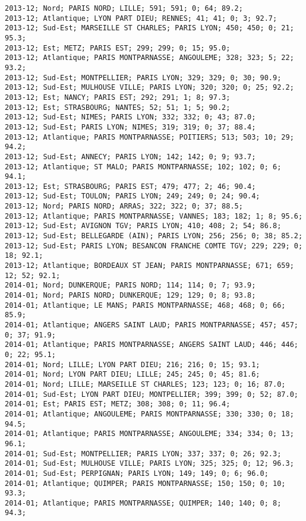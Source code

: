 \documentclass{article}
\begin{document}
\begin{Verbatim}[commandchars=\\\{\}]
2013-12; Nord; PARIS NORD; LILLE; 591; 591; 0; 64; 89.2; 
2013-12; Atlantique; LYON PART DIEU; RENNES; 41; 41; 0; 3; 92.7; 
2013-12; Sud-Est; MARSEILLE ST CHARLES; PARIS LYON; 450; 450; 0; 21; 95.3; 
2013-12; Est; METZ; PARIS EST; 299; 299; 0; 15; 95.0; 
2013-12; Atlantique; PARIS MONTPARNASSE; ANGOULEME; 328; 323; 5; 22; 93.2; 
2013-12; Sud-Est; MONTPELLIER; PARIS LYON; 329; 329; 0; 30; 90.9; 
2013-12; Sud-Est; MULHOUSE VILLE; PARIS LYON; 320; 320; 0; 25; 92.2; 
2013-12; Est; NANCY; PARIS EST; 292; 291; 1; 8; 97.3; 
2013-12; Est; STRASBOURG; NANTES; 52; 51; 1; 5; 90.2; 
2013-12; Sud-Est; NIMES; PARIS LYON; 332; 332; 0; 43; 87.0; 
2013-12; Sud-Est; PARIS LYON; NIMES; 319; 319; 0; 37; 88.4; 
2013-12; Atlantique; PARIS MONTPARNASSE; POITIERS; 513; 503; 10; 29; 94.2; 
2013-12; Sud-Est; ANNECY; PARIS LYON; 142; 142; 0; 9; 93.7; 
2013-12; Atlantique; ST MALO; PARIS MONTPARNASSE; 102; 102; 0; 6; 94.1; 
2013-12; Est; STRASBOURG; PARIS EST; 479; 477; 2; 46; 90.4; 
2013-12; Sud-Est; TOULON; PARIS LYON; 249; 249; 0; 24; 90.4; 
2013-12; Nord; PARIS NORD; ARRAS; 322; 322; 0; 37; 88.5; 
2013-12; Atlantique; PARIS MONTPARNASSE; VANNES; 183; 182; 1; 8; 95.6; 
2013-12; Sud-Est; AVIGNON TGV; PARIS LYON; 410; 408; 2; 54; 86.8; 
2013-12; Sud-Est; BELLEGARDE (AIN); PARIS LYON; 256; 256; 0; 38; 85.2; 
2013-12; Sud-Est; PARIS LYON; BESANCON FRANCHE COMTE TGV; 229; 229; 0; 18; 92.1; 
2013-12; Atlantique; BORDEAUX ST JEAN; PARIS MONTPARNASSE; 671; 659; 12; 52; 92.1; 
2014-01; Nord; DUNKERQUE; PARIS NORD; 114; 114; 0; 7; 93.9; 
2014-01; Nord; PARIS NORD; DUNKERQUE; 129; 129; 0; 8; 93.8; 
2014-01; Atlantique; LE MANS; PARIS MONTPARNASSE; 468; 468; 0; 66; 85.9; 
2014-01; Atlantique; ANGERS SAINT LAUD; PARIS MONTPARNASSE; 457; 457; 0; 37; 91.9; 
2014-01; Atlantique; PARIS MONTPARNASSE; ANGERS SAINT LAUD; 446; 446; 0; 22; 95.1; 
2014-01; Nord; LILLE; LYON PART DIEU; 216; 216; 0; 15; 93.1; 
2014-01; Nord; LYON PART DIEU; LILLE; 245; 245; 0; 45; 81.6; 
2014-01; Nord; LILLE; MARSEILLE ST CHARLES; 123; 123; 0; 16; 87.0; 
2014-01; Sud-Est; LYON PART DIEU; MONTPELLIER; 399; 399; 0; 52; 87.0; 
2014-01; Est; PARIS EST; METZ; 308; 308; 0; 11; 96.4; 
2014-01; Atlantique; ANGOULEME; PARIS MONTPARNASSE; 330; 330; 0; 18; 94.5; 
2014-01; Atlantique; PARIS MONTPARNASSE; ANGOULEME; 334; 334; 0; 13; 96.1; 
2014-01; Sud-Est; MONTPELLIER; PARIS LYON; 337; 337; 0; 26; 92.3; 
2014-01; Sud-Est; MULHOUSE VILLE; PARIS LYON; 325; 325; 0; 12; 96.3; 
2014-01; Sud-Est; PERPIGNAN; PARIS LYON; 149; 149; 0; 6; 96.0; 
2014-01; Atlantique; QUIMPER; PARIS MONTPARNASSE; 150; 150; 0; 10; 93.3; 
2014-01; Atlantique; PARIS MONTPARNASSE; QUIMPER; 140; 140; 0; 8; 94.3; 

\end{Verbatim}
\end{document}
